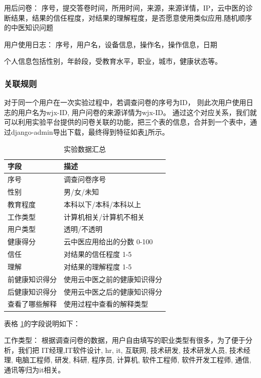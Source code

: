 用后问卷： 序号，提交答卷时间，所用时间，来源，来源详情，IP，云中医的诊断结果，结果的信任程度，对结果的理解程度，是否愿意使用类似应用,随机顺序的中医知识问题

用户使用日志： 序号，用户名，设备信息，操作名，操作信息，日期 

个人信息包括性别，年龄段，受教育水平，职业，城市，健康状态等。

\subsubsection{关联规则}
对于同一个用户在一次实验过程中，若调查问卷的序号为ID， 则此次用户使用日志的用户名为wjx-ID, 用户问卷的来源详情为wjx-ID。 
通过这个对应关系，我们就可以利用实验平台提供的问卷关联的功能，把三个表的信息，合并到一个表中，通过django-admin导出下载，最终得到特征如表\ref{tab:exp_data}所示。


\begin{table}[h]
    \centering
    \begin{tabular}{ll}
        \toprule
        字段 & 描述 \\ 
        \midrule
        序号 & 调查问卷序号 \\
        性别 & 男/女/未知 \\
        教育程度 & 本科以下/本科/本科以上 \\
        工作类型 & 计算机相关/计算机不相关 \\
        用户类型 & 透明/不透明 \\
        健康得分 & 云中医应用给出的分数 0-100 \\
        信任 & 对结果的信任程度 1-5 \\
        理解 & 对结果的理解程度 1-5 \\
        前健康知识得分 & 使用云中医之前的健康知识得分 \\
        后健康知识得分 & 使用云中医之后的健康知识得分 \\
        查看了哪些解释 & 使用过程中查看的解释类型 \\
        \bottomrule
    \end{tabular}
    \caption{实验数据汇总}
    \label{tab:exp_data}
\end{table}

表格 \ref{tab:exp_data}的字段说明如下：

工作类型： 根据调查问卷的数据，用户自由填写的职业类型有很多，为了便于分析，我们把 IT经理,IT软件设计, hr, it, 互联网, 技术研发, 技术研发人员, 技术经理, 电脑工程师, 研发, 科研, 程序员, 计算机, 软件工程师, 软件开发工程师, 通信, 通讯等归为it相关。

